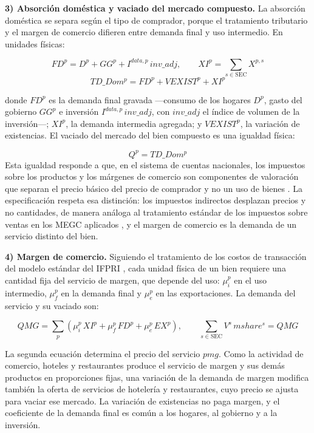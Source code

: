 \documentclass[11pt]{article}
\begin{document}
\textbf{3) Absorción doméstica y vaciado del mercado compuesto.} La absorción doméstica se separa según el tipo de comprador, porque el tratamiento tributario y el margen de comercio difieren entre demanda final y uso intermedio. En unidades físicas:

\[
FD^{p}=D^{p}+GG^{p}+I^{data,p}\,inv\_adj,
\qquad
XI^{p}=\sum_{s\in\mathrm{SEC}}X^{p,s}
\]
\[
TD\_Dom^{p}=FD^{p}+VEXIST^{p}+XI^{p}
\]

donde $FD^{p}$ es la demanda final gravada ---consumo de los hogares $D^{p}$, gasto del gobierno $GG^{p}$ e inversión $I^{data,p}\,inv\_adj$, con $inv\_adj$ el índice de volumen de la inversión---; $XI^{p}$, la demanda intermedia agregada; y $VEXIST^{p}$, la variación de existencias. El vaciado del mercado del bien compuesto es una igualdad física:

\[
Q^{p}=TD\_Dom^{p}
\]
Esta igualdad responde a que, en el sistema de cuentas nacionales, los impuestos sobre los productos y los márgenes de comercio son componentes de valoración que separan el precio básico del precio de comprador y no un uso de bienes \cite{sna_2008}. La especificación respeta esa distinción: los impuestos indirectos desplazan precios y no cantidades, de manera análoga al tratamiento estándar de los impuestos sobre ventas en los MEGC aplicados \cite{lofgren_harris_robinson_2002}, y el margen de comercio es la demanda de un servicio distinto del bien.

\textbf{4) Margen de comercio.} Siguiendo el tratamiento de los costos de transacción del modelo estándar del IFPRI \cite{lofgren_harris_robinson_2002}, cada unidad física de un bien requiere una cantidad fija del servicio de margen, que depende del uso: $\mu_{i}^{p}$ en el uso intermedio, $\mu_{f}^{p}$ en la demanda final y $\mu_{e}^{p}$ en las exportaciones. La demanda del servicio y su vaciado son:

\[
QMG=\sum_{p}\left(\mu_{i}^{p}\,XI^{p}+\mu_{f}^{p}\,FD^{p}+\mu_{e}^{p}\,EX^{p}\right),
\qquad
\sum_{s\in\mathrm{SEC}}V^{s}\,mshare^{s}=QMG
\]

La segunda ecuación determina el precio del servicio $pmg$. Como la actividad de comercio, hoteles y restaurantes produce el servicio de margen y sus demás productos en proporciones fijas, una variación de la demanda de margen modifica también la oferta de servicios de hotelería y restaurantes, cuyo precio se ajusta para vaciar ese mercado. La variación de existencias no paga margen, y el coeficiente de la demanda final es común a los hogares, al gobierno y a la inversión.
\end{document}
